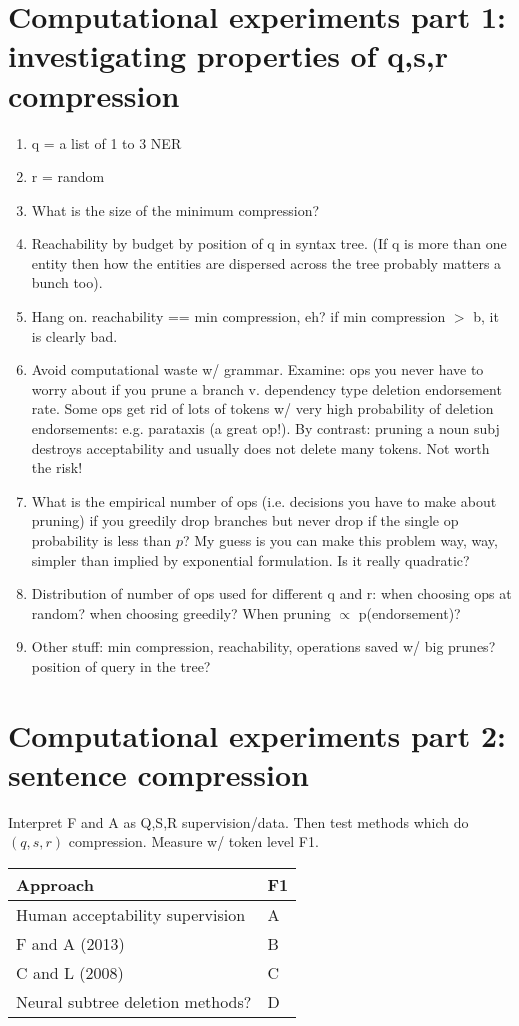 \documentclass[11pt,a4paper]{article}
\begin{document}
\section{Computational experiments part 1: investigating properties of q,s,r compression}
\begin{enumerate}
\item{q = a list of 1 to 3 NER}
\item{r = random}
\item{What is the size of the minimum compression?}
\item{Reachability by budget by position of q in syntax tree. (If q is more than one entity then how the entities are dispersed across the tree probably matters a bunch too).}
\item{Hang on. reachability == min compression, eh? if min compression $>$ b, it is clearly bad.}
\item{Avoid computational waste w/ grammar.  Examine: ops you never have to worry about if you prune a branch v. dependency type deletion endorsement rate. Some ops get rid of lots of tokens w/ very high probability of deletion endorsements: e.g. parataxis (a great op!). By contrast: pruning a noun subj destroys acceptability and usually does not delete many tokens. Not worth the risk!}
\item{What is the empirical number of ops (i.e. decisions you have to make about pruning) if you greedily drop branches but never drop if the single op probability is less than $p$? My guess is you can make this problem way, way, simpler than implied by exponential formulation. Is it really quadratic?}
\item{Distribution of number of ops used for different q and r: when choosing ops at random? when choosing greedily? When pruning $\propto$ p(endorsement)?}
\item{Other stuff: min compression, reachability, operations saved w/ big prunes? position of query in the tree?}
\end{enumerate}

\section{Computational experiments part 2: sentence compression}
Interpret F and A as Q,S,R supervision/data. Then test methods which do $(q,s,r)$ compression. Measure w/ token level F1.


\begin{table}[htb!]
\begin{tabular}{ll}
\centering
Approach & F1 \\ \hline
Human acceptability supervision         &  A          \\
F and A (2013)    & B           \\
C and L (2008)    & C        \\
Neural subtree deletion methods? &  D    \\   
\end{tabular}
\end{table}
\end{document}
